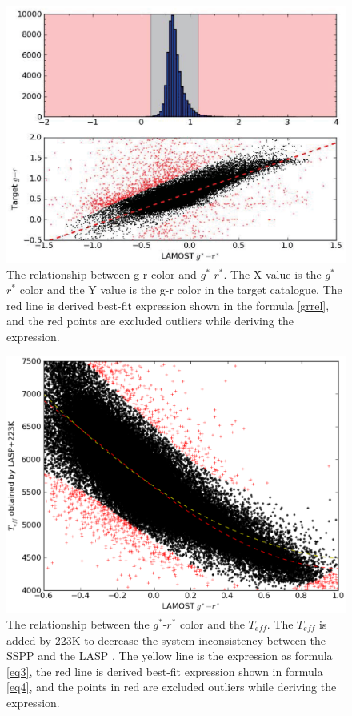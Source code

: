 \documentclass[manuscript]{aastex}
\begin{document}
   \begin{figure}
   \centering
   \includegraphics[width=14cm, angle=0, clip=true]{f1.eps}
   \caption{The relationship between g-r color and $g^*$-$r^*$.
   The X value is the $g^*$-$r^*$ color and the Y value is the g-r color  in the target catalogue.
   The red line is  derived best-fit expression shown in the formula \ref{grrel},
   and the red points are excluded outliers while deriving the expression.
   }
   \label{Fig2}
   \end{figure}

   \begin{figure}
   \centering
   \includegraphics[width=14cm, angle=0,clip]{f3.eps}
   \caption{The relationship between the $g^*$-$r^*$  color and the $T_{eff}$.
   The $T_{eff}$ is added by 223K to decrease the system inconsistency between the SSPP and the LASP \citep{wu2011automatic}.
    The yellow line is the expression as formula \ref{eq3},
     the red line is  derived best-fit expression shown in formula \ref{eq4},
     and the points in red are excluded outliers while deriving the expression.   }
   \label{Fig3}
   \end{figure}
\end{document}
